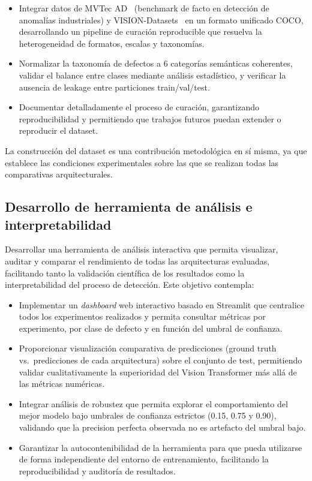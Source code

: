 \begin{itemize}
    \item Integrar datos de MVTec AD~\cite{bergmann2019mvtec} (benchmark de facto en detección de anomalías industriales) y VISION-Datasets~\cite{bai2023visiondatasets} en un formato unificado COCO, desarrollando un pipeline de curación reproducible que resuelva la heterogeneidad de formatos, escalas y taxonomías.

    \item Normalizar la taxonomía de defectos a 6 categorías semánticas coherentes, validar el balance entre clases mediante análisis estadístico, y verificar la ausencia de leakage entre particiones train/val/test.
    
    \item Documentar detalladamente el proceso de curación, garantizando reproducibilidad y permitiendo que trabajos futuros puedan extender o reproducir el dataset.
\end{itemize}

La construcción del dataset es una contribución metodológica en sí misma, ya que establece las condiciones experimentales sobre las que se realizan todas las comparativas arquitecturales.

\subsection{Desarrollo de herramienta de análisis e interpretabilidad}

Desarrollar una herramienta de análisis interactiva que permita visualizar, auditar y comparar el rendimiento de todas las arquitecturas evaluadas, facilitando tanto la validación científica de los resultados como la interpretabilidad del proceso de detección. Este objetivo contempla:

\begin{itemize}
    \item Implementar un \textit{dashboard} web interactivo basado en Streamlit que centralice todos los experimentos realizados y permita consultar métricas por experimento, por clase de defecto y en función del umbral de confianza.

    \item Proporcionar visualización comparativa de predicciones (ground truth vs.\ predicciones de cada arquitectura) sobre el conjunto de test, permitiendo validar cualitativamente la superioridad del Vision Transformer más allá de las métricas numéricas.
    
    \item Integrar análisis de robustez que permita explorar el comportamiento del mejor modelo bajo umbrales de confianza estrictos (0.15, 0.75 y 0.90), validando que la precision perfecta observada no es artefacto del umbral bajo.
    
    \item Garantizar la autocontenibilidad de la herramienta para que pueda utilizarse de forma independiente del entorno de entrenamiento, facilitando la reproducibilidad y auditoría de resultados.
\end{itemize}

